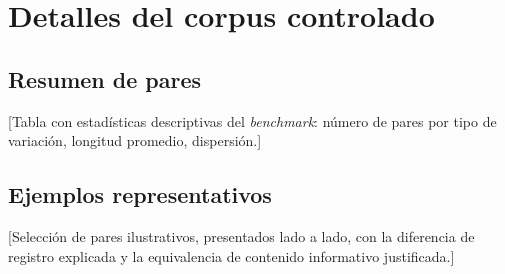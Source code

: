 \chapter{Detalles del corpus controlado}
\label{ap:corpus}

\section*{Resumen de pares}

[Tabla con estadísticas descriptivas del \emph{benchmark}: número de pares por
tipo de variación, longitud promedio, dispersión.]

\section*{Ejemplos representativos}

[Selección de pares ilustrativos, presentados lado a lado, con la diferencia
de registro explicada y la equivalencia de contenido informativo justificada.]
